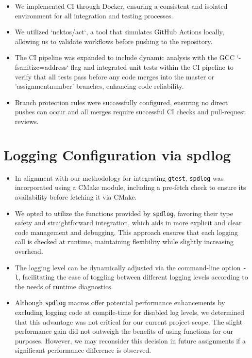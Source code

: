 \documentclass{article}
\begin{document}
\begin{itemize}
    \item We implemented CI through Docker, ensuring a consistent and isolated environment for all integration and testing processes.
    \item We utilized `nektos/act`, a tool that simulates GitHub Actions locally, allowing us to validate workflows before pushing to the repository.
    \item The CI pipeline was expanded to include dynamic analysis with the GCC `-fsanitize=address` flag and integrated unit tests within the CI pipeline to verify that all tests pass before any code merges into the master or 'assignment{number}' branches, enhancing code reliability.
    \item Branch protection rules were successfully configured, ensuring no direct pushes can occur and all merges require successful CI checks and pull-request reviews.
\end{itemize}

\section{Logging Configuration via spdlog}
\label{sec:spd}

\begin{itemize}
    \item In alignment with our methodology for integrating \verb|gtest|, \verb|spdlog| was incorporated using a CMake module, including a pre-fetch check to ensure its availability before fetching it via CMake.
    \item We opted to utilize the functions provided by \verb|spdlog|, favoring their type safety and straightforward integration, which aids in more explicit and clear code management and debugging. This approach ensures that each logging call is checked at runtime, maintaining flexibility while slightly increasing overhead.
    \item The logging level can be dynamically adjusted via the command-line option \texttt{-l}, facilitating the ease of toggling between different logging levels according to the needs of runtime diagnostics.
    \item Although \verb|spdlog| macros offer potential performance enhancements by excluding logging code at compile-time for disabled log levels, we determined that this advantage was not critical for our current project scope. The slight performance gain did not outweigh the benefits of using functions for our purposes. However, we may reconsider this decision in future assignments if a significant performance difference is observed.
\end{itemize}
\end{document}
